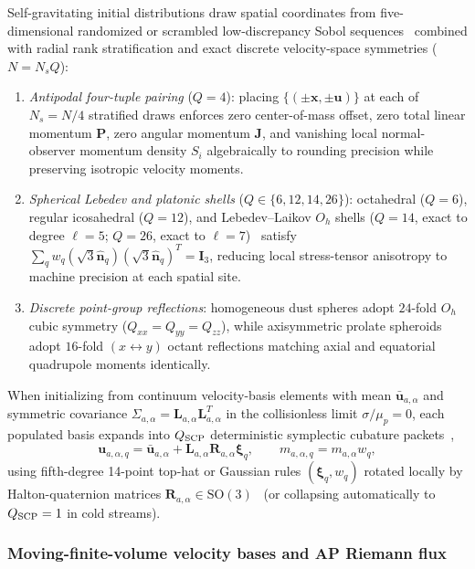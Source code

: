 Self-gravitating initial distributions draw spatial coordinates from five-dimensional randomized or scrambled low-discrepancy Sobol sequences~\cite{Sobol:1967} combined with radial rank stratification and exact discrete velocity-space symmetries ($N = N_s Q$):
\begin{enumerate}
\item \emph{Antipodal four-tuple pairing} ($Q = 4$): placing $\{(\pm\bm{x}, \pm\bm{u})\}$ at each of $N_s = N/4$ stratified draws enforces zero center-of-mass offset, zero total linear momentum $\bm{P}$, zero angular momentum $\bm{J}$, and vanishing local normal-observer momentum density $S_i$ algebraically to rounding precision while preserving isotropic velocity moments.
\item \emph{Spherical Lebedev and platonic shells} ($Q \in \{6, 12, 14, 26\}$): octahedral ($Q=6$), regular icosahedral ($Q=12$), and Lebedev--Laikov $O_h$ shells ($Q=14$, exact to degree $\ell = 5$; $Q=26$, exact to $\ell = 7$)~\cite{Lebedev:1976} satisfy $\sum_q w_q (\sqrt{3}\hat{\bm{n}}_q)(\sqrt{3}\hat{\bm{n}}_q)^T = \bm{I}_3$, reducing local stress-tensor anisotropy to machine precision at each spatial site.
\item \emph{Discrete point-group reflections}: homogeneous dust spheres adopt $24$-fold $O_h$ cubic symmetry ($Q_{xx}=Q_{yy}=Q_{zz}$), while axisymmetric prolate spheroids adopt $16$-fold $(x \leftrightarrow y)$ octant reflections matching axial and equatorial quadrupole moments identically.
\end{enumerate}
When initializing from continuum velocity-basis elements with mean $\bar{\bm{u}}_{a,\alpha}$ and symmetric covariance $\Sigma_{a,\alpha} = \bm{L}_{a,\alpha}\bm{L}_{a,\alpha}^T$ in the collisionless limit $\sigma/\mu_p = 0$, each populated basis expands into $Q_{\rm SCP}$ deterministic symplectic cubature packets~\cite{Stroud:1971},
\begin{equation}\label{eq:scp_map}
\bm{u}_{a,\alpha,q} = \bar{\bm{u}}_{a,\alpha} + \bm{L}_{a,\alpha}\bm{R}_{a,\alpha}\bm{\xi}_q, \qquad m_{a,\alpha,q} = m_{a,\alpha} w_q,
\end{equation}
using fifth-degree 14-point top-hat or Gaussian rules $(\bm{\xi}_q, w_q)$ rotated locally by Halton-quaternion matrices $\bm{R}_{a,\alpha} \in \mathrm{SO}(3)$~\cite{Halton:1960} (or collapsing automatically to $Q_{\rm SCP} = 1$ in cold streams).

\subsubsection{Moving-finite-volume velocity bases and AP Riemann flux}

